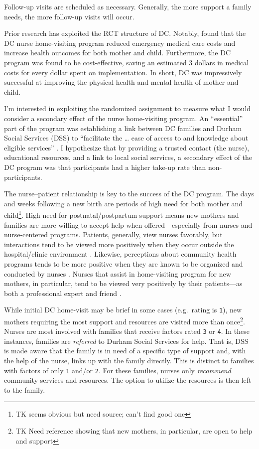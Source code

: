 \documentclass[12pt,letterpaperpaper,]{book}
\begin{document}
Follow-up visits are scheduled as necessary. Generally, the more support
a family needs, the more follow-up visits will occur.

Prior research has exploited the RCT structure of DC. Notably,
\citet{dodge_implementation_2013} found that the DC nurse home-visiting
program reduced emergency medical care costs and increase health
outcomes for both mother and child. Furthermore, the DC program was
found to be cost-effective, saving an estimated 3 dollars in medical
costs for every dollar spent on implementation. In short, DC was
impressively successful at improving the physical health and mental
health of mother and child.

I'm interested in exploiting the randomized assignment to measure what I
would consider a secondary effect of the nurse home-visiting program. An
``essential'' part of the program was establishing a link between DC
families and Durham Social Services (DSS) to ``facilitate the \ldots{}
ease of access to and knowledge about eligible services''
\citep{odonnell_family_2015}. I hypothesize that by providing a trusted
contact (the nurse), educational resources, and a link to local social
services, a secondary effect of the DC program was that participants had
a higher take-up rate than non-participants.

The nurse--patient relationship is key to the success of the DC program.
The days and weeks following a new birth are periods of high need for
both mother and child\footnote{TK seems obvious but need source; can't
  find good one}. High need for postnatal/postpartum support means new
mothers and families are more willing to accept help when
offered---especially from nurses and nurse-centered programs. Patients,
generally, view nurses favorably, but interactions tend to be viewed
more positively when they occur outside the hospital/clinic environment
\citep{jansson_first-time_2002}. Likewise, perceptions about community
health programs tends to be more positive when they are known to be
organized and conducted by nurses \citep{kneipp_reasons_2009}. Nurses
that assist in home-visiting program for new mothers, in particular,
tend to be viewed very positively by their patients---as both a
professional expert and friend \citep{landy_mothers_2012}.

While initial DC home-visit may be brief in some cases (e.g.~rating is
\texttt{1}), new mothers requiring the most support and resources are
visited more than once\footnote{TK Need reference showing that new
  mothers, in particular, are open to help and support}. Nurses are most
involved with families that receive factors rated \texttt{3} or
\texttt{4}. In these instances, families are \emph{referred} to Durham
Social Services for help. That is, DSS is made aware that the family is
in need of a specific type of support and, with the help of the nurse,
links up with the family directly. This is distinct to families with
factors of only \texttt{1} and/or \texttt{2}. For these families, nurses
only \emph{recommend} community services and resources. The option to
utilize the resources is then left to the family.
\end{document}
